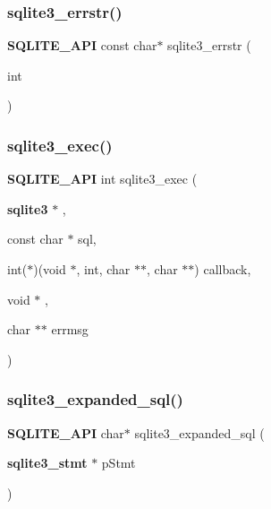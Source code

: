 \mbox{\label{sqlite3_8h_ad8b8afa48d2dc1e4f96be510d59e4be0}} 
\subsubsection{sqlite3\_errstr()}
{\footnotesize\ttfamily \textbf{ S\+Q\+L\+I\+T\+E\+\_\+\+A\+PI} const char$\ast$ sqlite3\+\_\+errstr (\begin{DoxyParamCaption}\item[{int}]{ }\end{DoxyParamCaption})}

\mbox{\label{sqlite3_8h_a97487ec8150e0bcc8fa392ab8f0e24db}} 
\subsubsection{sqlite3\_exec()}
{\footnotesize\ttfamily \textbf{ S\+Q\+L\+I\+T\+E\+\_\+\+A\+PI} int sqlite3\+\_\+exec (\begin{DoxyParamCaption}\item[{\textbf{ sqlite3} $\ast$}]{,  }\item[{const char $\ast$}]{sql,  }\item[{int($\ast$)(void $\ast$, int, char $\ast$$\ast$, char $\ast$$\ast$)}]{callback,  }\item[{void $\ast$}]{,  }\item[{char $\ast$$\ast$}]{errmsg }\end{DoxyParamCaption})}

\mbox{\label{sqlite3_8h_a6a8f9469470b96dafcfeade66af97c7d}} 
\subsubsection{sqlite3\_expanded\_sql()}
{\footnotesize\ttfamily \textbf{ S\+Q\+L\+I\+T\+E\+\_\+\+A\+PI} char$\ast$ sqlite3\+\_\+expanded\+\_\+sql (\begin{DoxyParamCaption}\item[{\textbf{ sqlite3\+\_\+stmt} $\ast$}]{p\+Stmt }\end{DoxyParamCaption})}

\mbox{\label{sqlite3_8h_a65be1f8fb5dc68185aa4d7216a89d795}} 
